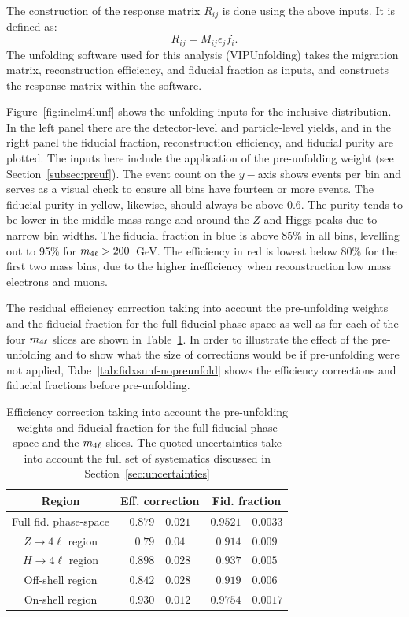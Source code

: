 The construction of the response matrix $R_{ij}$ is done using the above inputs. It is defined as:
\begin{equation}
    R_{ij} = M_{ij}\epsilon_jf_i.
\end{equation}
The unfolding software used for this analysis (VIPUnfolding) takes the migration matrix, reconstruction efficiency, and fiducial fraction as inputs, and constructs the response matrix within the software. 

Figure~\ref{fig:inclm4lunf} shows the unfolding inputs for the inclusive \mFourL{} distribution. In the left panel there are the detector-level and particle-level yields, and in the right panel the fiducial fraction, reconstruction efficiency, and fiducial purity are plotted. The inputs here include the application of the pre-unfolding weight (see Section~\ref{subsec:preuf}). The event count on the $y-$axis shows events per bin and serves as a visual check to ensure all bins have fourteen or more events. The fiducial purity in yellow, likewise, should always be above 0.6. The purity tends to be lower in the middle mass range and around the $Z$ and Higgs peaks due to narrow bin widths. The fiducial fraction in blue is above 85\% in all bins, levelling out to 95\% for $m_{4\ell}{} > 200$~GeV. The efficiency in red is lowest below 80\% for the first two mass bins, due to the higher inefficiency when reconstruction low mass electrons and muons. 

 The residual efficiency correction taking into account the pre-unfolding weights and the fiducial fraction for the full fiducial phase-space as well as for each of the four $m_{4\ell}$ slices are shown in Table~\ref{tab:fidxsunf}.
 In order to illustrate the effect of the pre-unfolding and to show what the size of corrections would be if pre-unfolding were not applied, Tabe~\ref{tab:fidxsunf-nopreunfold} shows the efficiency corrections and fiducial fractions before pre-unfolding.
 \begin{table}[ht]
     \centering
     \begin{tabular} { c | r@{$\pm$} l  r@{$\pm$}l }
       \hline
       Region & \multicolumn{2}{c}{Eff. correction}  & \multicolumn{2}{c}{Fid. fraction}   \\
       \hline
       Full fid. phase-space & $0.879$ & $0.021$ & $0.9521$ & $0.0033$ \\[0.3cm]
       $Z\to 4\ell$ region  & $0.79$ & $0.04$ & $0.914$ & $0.009$ \\
       $H\to 4\ell$ region  & $0.898$ & $0.028$ & $0.937$ & $0.005$ \\
       Off-shell region & $0.842$ & $0.028$ & $0.919$ & $0.006$ \\
       On-shell region  & $0.930$ & $0.012$ & $0.9754$ & $0.0017$ \\
       \hline
    \end{tabular}
   \caption{Efficiency correction taking into account the pre-unfolding weights and fiducial fraction for the full fiducial phase space and the $m_{4\ell}$ slices. The quoted uncertainties take into account the full set of systematics discussed in Section~\ref{sec:uncertainties} \label{tab:fidxsunf} }
 \end{table}

